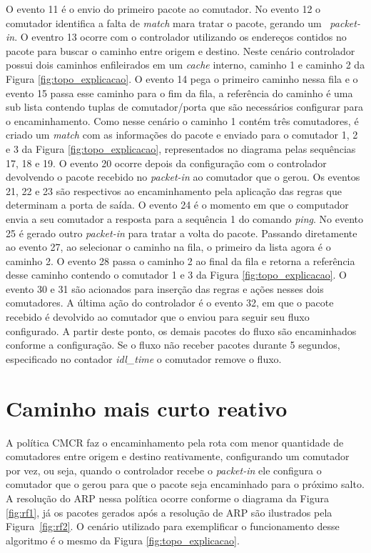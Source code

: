 O evento 11 é o envio do primeiro pacote ao comutador. No evento 12 o comutador identifica a falta de \emph{match} mara tratar o pacote, gerando um ~\textit{packet-in}. O eventro 13 ocorre com o controlador utilizando os endereços contidos no pacote para buscar o caminho entre origem e destino. Neste cenário  controlador possui dois caminhos enfileirados em um \textit{cache} interno, caminho 1 e caminho 2 da Figura \ref{fig:topo_explicacao}. O evento 14 pega o primeiro caminho nessa fila e o evento 15 passa esse caminho para o fim da fila, a referência do caminho é uma sub lista contendo tuplas de comutador/porta que são necessários configurar para o encaminhamento. 
Como nesse cenário o caminho 1 contém três comutadores, é criado um \emph{match} com as informações do pacote e enviado para o comutador 1, 2 e 3 da Figura \ref{fig:topo_explicacao}, representados no diagrama pelas sequências 17, 18 e 19. O evento 20 ocorre depois da configuração com o controlador devolvendo o pacote recebido no \emph{packet-in} ao comutador que o gerou. Os eventos 21, 22 e 23 são respectivos ao encaminhamento pela aplicação das regras que  determinam a porta de saída. O evento 24 é o momento em que o computador envia a seu comutador a resposta para a sequência 1 do comando \emph{ping}. No evento 25 é gerado outro \textit{packet-in} para tratar a volta do pacote. Passando diretamente ao evento 27, ao selecionar o caminho na fila, o primeiro da lista agora é o caminho 2. O evento 28 passa o caminho 2 ao final da fila e retorna a referência desse caminho contendo o comutador 1 e 3 da Figura \ref{fig:topo_explicacao}. O evento 30 e 31 são acionados para inserção das regras e ações nesses dois comutadores. A última ação do controlador é o evento 32, em que o pacote recebido é devolvido ao comutador que o enviou para seguir seu fluxo configurado. A partir deste ponto, os demais pacotes do fluxo são encaminhados conforme a configuração. Se o fluxo não receber pacotes durante 5 segundos, especificado no contador \textit{idl\_time} o comutador remove o fluxo.


\section{Caminho mais curto reativo}
\label{sec:rf}
A política CMCR faz o encaminhamento pela rota com menor quantidade de comutadores entre origem e destino reativamente, configurando um comutador por vez, ou seja, quando o controlador recebe o \textit{packet-in} ele configura o comutador que o gerou para que o pacote seja encaminhado para o próximo salto. A resolução do ARP nessa política ocorre conforme o diagrama da Figura \ref{fig:rf1}, já os pacotes gerados após a resolução de ARP são ilustrados pela Figura~\ref{fig:rf2}. O cenário utilizado para exemplificar o funcionamento desse algoritmo é o mesmo da Figura \ref{fig:topo_explicacao}.

